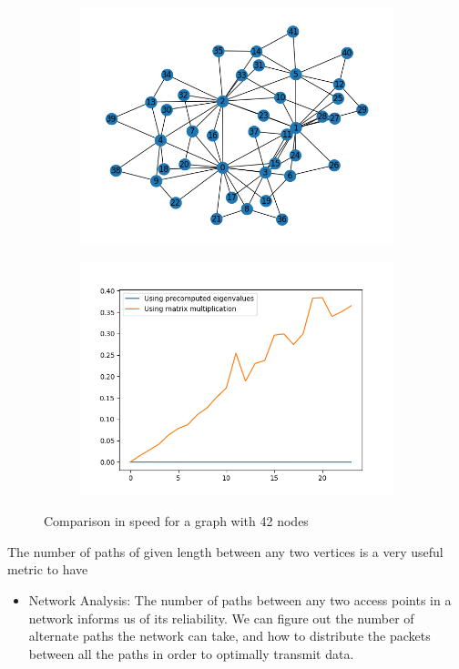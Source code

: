 \documentclass[12pt, a4paper]{article}
\begin{document}
\begin{flushleft}
    \begin{figure}
      \centering
      \begin{subfigure}{0.49\textwidth}
        \centering
    \includegraphics[width=1\textwidth]{42nodesgraph}
      \end{subfigure}
      \begin{subfigure}{0.49\textwidth}
        \centering
    \includegraphics[width=1\textwidth]{42nodesoutput}
      \end{subfigure}
    \caption{Comparison in speed for a graph with 42 nodes}
    \end{figure}
      The number of paths of given length between any two vertices is a very useful metric to have
      \begin{itemize}
        \item Network Analysis: The number of paths between any two access points in a network informs us of its reliability. We can figure out the number of alternate paths the network can take, and how to distribute the packets between all the paths in order to optimally transmit data.


\end{itemize}
\end{flushleft}
\end{document}
